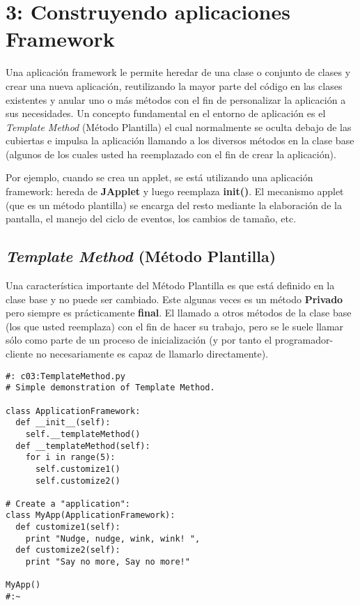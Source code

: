 \section*{3: Construyendo aplicaciones Framework}
\label{sec:caf}

Una aplicación framework le permite heredar de una clase o conjunto de clases y crear una nueva aplicación, reutilizando la mayor parte del código en las clases existentes y anular uno o más métodos con el fin de personalizar la aplicación a sus necesidades. Un concepto fundamental en el entorno de aplicación es el \textit{Template Method} (Método Plantilla) el cual normalmente se oculta debajo de las cubiertas e impulsa la aplicación  llamando a los diversos métodos en la clase base (algunos de los cuales usted ha reemplazado con el fin de crear la aplicación).    \newline

Por ejemplo, cuando se crea un applet, se está utilizando una aplicación framework: hereda de \textbf{JApplet} y luego reemplaza \textbf{init()}. El mecanismo applet (que es un método plantilla) se encarga del resto mediante la elaboración de la pantalla, el manejo del ciclo de eventos, los cambios de tamaño, etc.
        
        
\subsection*{\textit{Template Method} (Método Plantilla)}
\label{subsec:tm}
                
        
Una característica importante del Método Plantilla es que está definido en la clase base y no puede ser cambiado. Este algunas veces es un método \textbf{Privado} pero siempre es prácticamente \textbf{final}. El llamado a otros métodos de la clase base (los que usted reemplaza) con el fin de hacer su trabajo, pero se le suele llamar sólo como parte de un proceso de inicialización (y por tanto el programador-cliente no necesariamente es capaz de llamarlo directamente).    \newline

 \begin{lstlisting}
#: c03:TemplateMethod.py 
# Simple demonstration of Template Method. 

class ApplicationFramework: 
  def __init__(self): 
    self.__templateMethod() 
  def __templateMethod(self): 
    for i in range(5): 
      self.customize1() 
      self.customize2() 
      
# Create a "application": 
class MyApp(ApplicationFramework): 
  def customize1(self): 
    print "Nudge, nudge, wink, wink! ", 
  def customize2(self):  
    print "Say no more, Say no more!" 
    
MyApp() 
#:~ 
\end{lstlisting}

